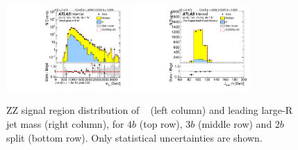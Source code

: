 \begin{figure}[htb!]
\begin{center}
\includegraphics[width=0.41\textwidth,angle=-90]{figures/boosted/ZZ/Moriond_ZZ_TwoTag_split_Signal_mHH_l_1.pdf}
\includegraphics[width=0.41\textwidth,angle=-90]{figures/boosted/ZZ/Moriond_ZZ_TwoTag_split_Signal_leadHCand_Mass_s.pdf}\\
\end{center}
\caption{ZZ signal region distribution of \mtwoJ~ (left column) and leading large-R jet mass (right column), for $4b$ (top row), $3b$ (middle row) and $2b$ split (bottom row). Only statistical uncertainties are shown.}
\label{fig:ZZSR_Distribution}
\end{figure}

% 

% 

% 


